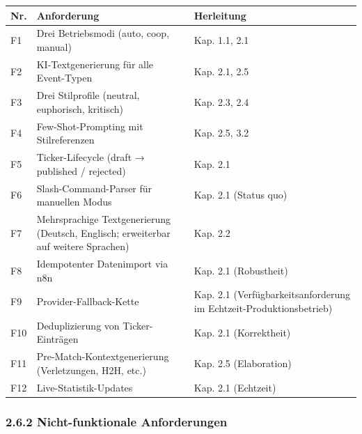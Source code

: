 {\def\LTcaptype{none} %
\begin{longtable}[]{@{}
  >{\raggedright\arraybackslash}p{}
  >{\raggedright\arraybackslash}p{}
  >{\raggedright\arraybackslash}p{}@{}}
\toprule\noalign{}
\begin{minipage}[b]{\linewidth}\raggedright
Nr.
\end{minipage} & \begin{minipage}[b]{\linewidth}\raggedright
Anforderung
\end{minipage} & \begin{minipage}[b]{\linewidth}\raggedright
Herleitung
\end{minipage} \\
\midrule\noalign{}
\endhead
\bottomrule\noalign{}
\endlastfoot
F1 & Drei Betriebsmodi (auto, coop, manual) & Kap. 1.1, 2.1 \\
F2 & KI-Textgenerierung für alle Event-Typen & Kap. 2.1, 2.5 \\
F3 & Drei Stilprofile (neutral, euphorisch, kritisch) & Kap. 2.3, 2.4 \\
F4 & Few-Shot-Prompting mit Stilreferenzen & Kap. 2.5, 3.2 \\
F5 & Ticker-Lifecycle (draft → published / rejected) & Kap. 2.1 \\
F6 & Slash-Command-Parser für manuellen Modus & Kap. 2.1 (Status quo) \\
F7 & Mehrsprachige Textgenerierung (Deutsch, Englisch; erweiterbar auf
weitere Sprachen) & Kap. 2.2 \\
F8 & Idempotenter Datenimport via n8n & Kap. 2.1 (Robustheit) \\
F9 & Provider-Fallback-Kette & Kap. 2.1 (Verfügbarkeitsanforderung im
Echtzeit-Produktionsbetrieb) \\
F10 & Deduplizierung von Ticker-Einträgen & Kap. 2.1 (Korrektheit) \\
F11 & Pre-Match-Kontextgenerierung (Verletzungen, H2H, etc.) & Kap. 2.5
(Elaboration) \\
F12 & Live-Statistik-Updates & Kap. 2.1 (Echtzeit) \\
\end{longtable}
}

\subsubsection{2.6.2 Nicht-funktionale
Anforderungen}\label{nicht-funktionale-anforderungen}

